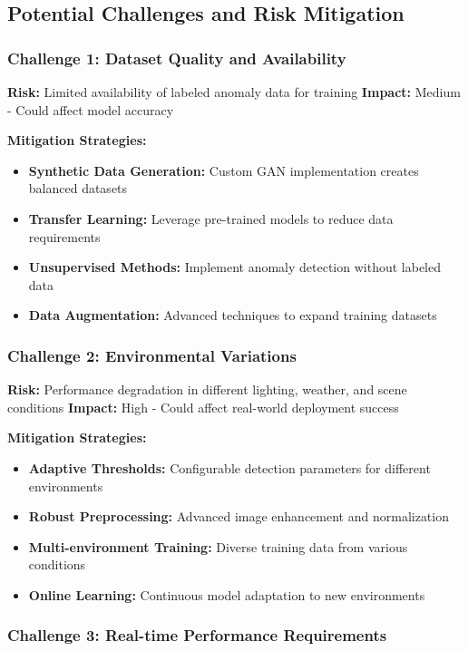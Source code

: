 \documentclass[12pt,a4paper]{article}
\begin{document}
\subsection{Potential Challenges and Risk Mitigation}

\subsubsection{Challenge 1: Dataset Quality and Availability}

\textbf{Risk:} Limited availability of labeled anomaly data for training
\textbf{Impact:} Medium - Could affect model accuracy

\textbf{Mitigation Strategies:}
\begin{itemize}
    \item \textbf{Synthetic Data Generation:} Custom GAN implementation creates balanced datasets
    \item \textbf{Transfer Learning:} Leverage pre-trained models to reduce data requirements
    \item \textbf{Unsupervised Methods:} Implement anomaly detection without labeled data
    \item \textbf{Data Augmentation:} Advanced techniques to expand training datasets
\end{itemize}

\subsubsection{Challenge 2: Environmental Variations}

\textbf{Risk:} Performance degradation in different lighting, weather, and scene conditions
\textbf{Impact:} High - Could affect real-world deployment success

\textbf{Mitigation Strategies:}
\begin{itemize}
    \item \textbf{Adaptive Thresholds:} Configurable detection parameters for different environments
    \item \textbf{Robust Preprocessing:} Advanced image enhancement and normalization
    \item \textbf{Multi-environment Training:} Diverse training data from various conditions
    \item \textbf{Online Learning:} Continuous model adaptation to new environments
\end{itemize}

\subsubsection{Challenge 3: Real-time Performance Requirements}
\end{document}
